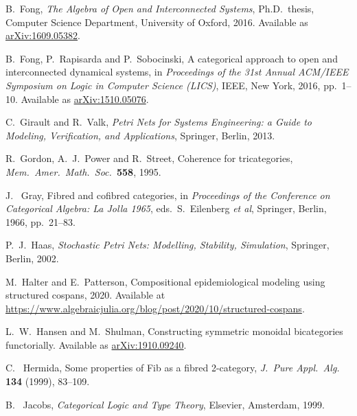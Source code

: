 \documentclass[reqno]{amsart}
\begin{document}
\begin{thebibliography}{100}
 B.\ Fong, \textsl{The Algebra of Open and Interconnected Systems},
Ph.D.\ thesis, Computer Science Department, University of Oxford, 2016.
Available as \href{https://arxiv.org/abs/1609.05382}{arXiv:1609.05382}.

 B.\ Fong, P.\ Rapisarda and P.\ Sobocinski, A categorical approach to open and interconnected dynamical systems, in \textsl{Proceedings of the 31st Annual ACM/IEEE Symposium on Logic in Computer Science (LICS)}, IEEE, New York, 2016, pp.\ 1--10.  Available as \href{http://arxiv.org/abs/510.05076}{arXiv:1510.05076}.

 C.\ Girault and R.\ Valk, \textsl{Petri Nets for Systems Engineering: a Guide to Modeling, Verification, and Applications}, Springer, Berlin, 2013.

 R.\ Gordon, A.\ J.\ Power and R.\ Street, Coherence for tricategories, \textsl{Mem.\ Amer.\ Math.\ Soc.\ }\textbf{558}, 1995.



 J. \ Gray, Fibred and cofibred categories, in \textsl{Proceedings of the Conference on Categorical Algebra: La Jolla 1965}, eds.\ S.\ Eilenberg \textit{et al}, Springer, Berlin, 1966, pp.\ 21--83.

 P.\ J.\ Haas, \textsl{Stochastic Petri Nets: Modelling, Stability, Simulation},
Springer, Berlin, 2002.

 M.\ Halter and E.\ Patterson, Compositional epidemiological modeling using structured cospans, 2020.  Available at \href{https://www.algebraicjulia.org/blog/post/2020/10/structured-cospans}{https://www.algebraicjulia.org/blog/post/2020/10/structured-cospans}.

  L.\ W.\ Hansen and M.\ Shulman, Constructing symmetric monoidal bicategories functorially.  Available as \href{https://arxiv.org/abs/1910.09240}{arXiv:1910.09240}.

 C. \ Hermida, Some properties of Fib as a fibred 2-category, \textsl{J.\ Pure Appl.\ Alg.\ } \textbf{134} (1999), 83--109.

 B. \ Jacobs, \textsl{Categorical Logic and Type Theory}, Elsevier, Amsterdam, 1999.


\end{thebibliography}
\end{document}
